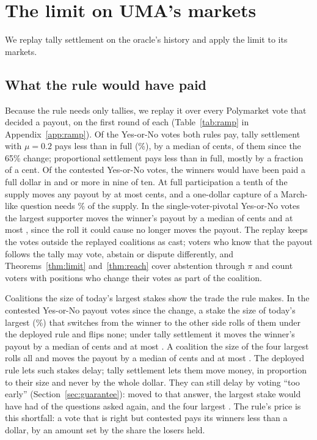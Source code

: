 \documentclass[conference,compsoc]{IEEEtran}
\newcommand{\muparam}{\mu}
\begin{document}
\section{The limit on UMA's markets}
\label{sec:uma}
We replay tally settlement on the oracle's history and apply the limit to its markets.

\subsection{What the rule would have paid}
\label{sec:ramp-replay}
 Because the rule needs only tallies, we replay it over every Polymarket vote that decided a payout, on the first round of each (Table~\ref{tab:ramp} in Appendix~\ref{app:ramp}). Of the \rampYesNoBothPay{} Yes-or-No votes both rules pay, tally settlement with $\muparam = 0.2$ pays \rampCutTwenty{} less than in full (\rampCutPctTwenty\%), by a median of \rampHaircutTwenty{} cents, \rampCutEraBTwenty{} of them since the 65\% change; proportional settlement pays \rampCutZero{} less than in full, mostly by a fraction of a cent. Of the \rampContestedSidedN{} contested Yes-or-No votes, the winners would have been paid a full dollar in \rampWinnerFullTwenty{} and \rampWinnerPTenTwenty{} or more in nine of ten. At full participation a tenth of the supply moves any payout by at most \rampShiftTenPctTwenty{} cents, and a one-dollar capture of a March-like question needs \rampCaptureMarchTwenty\% of the supply. In the \rampPivotalN{} single-voter-pivotal Yes-or-No votes the largest supporter moves the winner's payout by a median of \rampPivotalMedianCentsTwenty{} cents and at most \rampPivotalMaxCentsTwenty, since the roll it could cause no longer moves the payout. The replay keeps the votes outside the replayed coalitions as cast; voters who know that the payout follows the tally may vote, abstain or dispute differently, and Theorems~\ref{thm:limit} and~\ref{thm:reach} cover abstention through $\pi$ and count voters with positions who change their votes as part of the coalition.

 Coalitions the size of today's largest stakes show the trade the rule makes. In the \coalEraBN{} contested Yes-or-No payout votes since the change, a stake the size of today's largest (\topOnePct\%) that switches from the winner to the other side rolls \coalTopOneRoll{} of them under the deployed rule and flips none; under tally settlement it moves the winner's payout by a median of \coalTopOneMedianCents{} cents and at most \coalTopOneMaxCents. A coalition the size of the four largest rolls all \coalTopFourRoll{} and moves the payout by a median of \coalTopFourMedianCents{} cents and at most \coalTopFourMaxCents. The deployed rule lets such stakes delay; tally settlement lets them move money, in proportion to their size and never by the whole dollar. They can still delay by voting ``too early'' (Section~\ref{sec:guarantee}): moved to that answer, the largest stake would have had \coalTopOneAskAgain{} of the \coalEraBN{} questions asked again, and the four largest \coalTopFourAskAgain. The rule's price is this shortfall: a vote that is right but contested pays its winners less than a dollar, by an amount set by the share the losers held.
\end{document}
